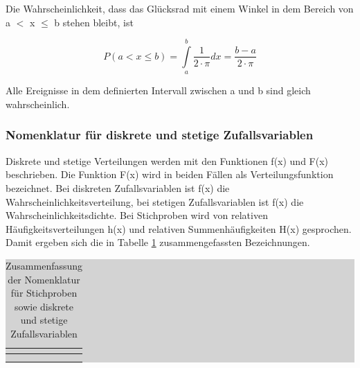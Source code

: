 \clearpage

\noindent Die Wahrscheinlichkeit, dass das Gl\"{u}cksrad mit einem Winkel in dem Bereich von a $\mathrm{<}$ x $\leq$ b stehen bleibt, ist 

\begin{equation}\label{eq:fourtwentyone}
P\left(a<x\le b\right)=\int\limits _{a}^{b}\dfrac{1}{2\cdot \pi } dx= \dfrac{b-a}{2\cdot \pi}
\end{equation}

\noindent Alle Ereignisse in dem definierten Intervall zwischen a und b sind gleich wahrscheinlich.

\subsubsection{Nomenklatur f\"{u}r diskrete und stetige Zufallsvariablen}

\noindent Diskrete und stetige Verteilungen werden mit den Funktionen f(x) und F(x) beschrieben. Die Funktion F(x) wird in beiden F\"{a}llen als Verteilungsfunktion bezeichnet. Bei diskreten Zufallsvariablen ist f(x) die Wahrscheinlichkeitsverteilung, bei stetigen Zufallsvariablen ist f(x) die Wahrscheinlichkeitsdichte. Bei Stichproben wird von relativen H\"{a}ufigkeitsverteilungen h(x) und relativen Summenh\"{a}ufigkeiten H(x) gesprochen. Damit ergeben sich die in Tabelle \ref{tab:fourthree} zusammengefassten Bezeichnungen.

\begin{table}[H]
\setlength{\arrayrulewidth}{.1em}
\caption{ Zusammenfassung der Nomenklatur f\"{u}r Stichproben sowie diskrete und stetige Zufallsvariablen}
\setlength{\fboxsep}{0pt}%
\colorbox{lightgray}{%
%
\begin{tabular}{| c | c | c |}
\hline
\parbox[c][0.3in][c]{1.9in}{\smallskip\centering\textbf{\selectfont{Stichprobe}}} &
\parbox[c][0.3in][c]{2.2in}{\smallskip\centering\textbf{\selectfont{Diskreter Zufallsprozess}}} &
\parbox[c][0.3in][c]{2.2in}{\smallskip\centering\textbf{\selectfont{Stetiger Zufallsprozess}}}\\ \hline

\parbox[c][0.5in][c]{1.9in}{\centering{}\selectfont{Relative Häufigkeitsverteilung h(x)}} & 
\parbox[c][0.5in][c]{2.2in}{\centering{}\selectfont{Wahrscheinlichkeitsverteilung f(x)}} &
\parbox[c][0.5in][c]{2.2in}{\centering{}\selectfont{Wahrscheinlichkeitsdichte f(x)}}\\
\hline

\parbox[c][0.5in][c]{1.9in}{\centering{}\selectfont{Relative Summenhäufigkeit H(x)}} & 
\parbox[c][0.5in][c]{2.2in}{\centering{}\selectfont{Verteilungsfunktion F(x)}} &
\parbox[c][0.5in][c]{2.2in}{\centering{}\selectfont{Verteilungsfunktion F(x)}}\\
\hline

\end{tabular}%
}
\label{tab:fourthree}
\end{table}
\noindent 

